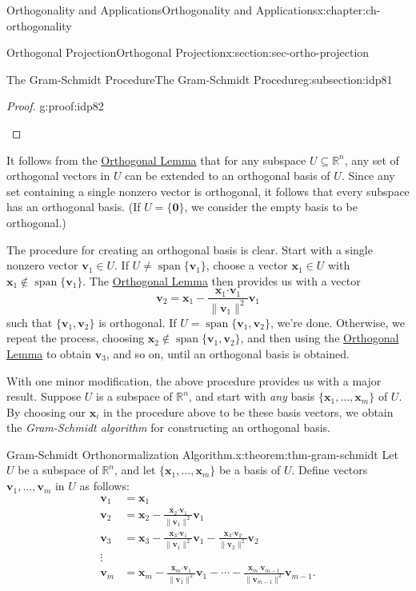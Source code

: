 \documentclass[oneside,10pt,]{book}
\numberwithin{equation}{section}
\newcommand{\spn}{\operatorname{span}}
\newcommand{\R}{\mathbb{R}}
\newcommand{\dotp}{\!\boldsymbol{\cdot}\!}
\newcommand{\len}[1]{\lVert #1\rVert}
\newcommand{\vv}{\mathbf{v}}
\newcommand{\xx}{\mathbf{x}}
\newcommand{\amp}{&}
\begin{document}
\begin{chapterptx}{Orthogonality and Applications}{}{Orthogonality and Applications}{}{}{x:chapter:ch-orthogonality}
\begin{sectionptx}{Orthogonal Projection}{}{Orthogonal Projection}{}{}{x:section:sec-ortho-projection}
\begin{subsectionptx}{The Gram-Schmidt Procedure}{}{The Gram-Schmidt Procedure}{}{}{g:subsection:idp81}
\begin{proof}{}{g:proof:idp82}
\begin{enumerate}
\end{enumerate}
%
\end{proof}
It follows from the \hyperref[x:theorem:thm-orthogonal-lemma]{Orthogonal Lemma} that for any subspace \(U\subseteq \R^n\), any set of orthogonal vectors in \(U\) can be extended to an orthogonal basis of \(U\). Since any set containing a single nonzero vector is orthogonal, it follows that every subspace has an orthogonal basis. (If \(U=\{\mathbf{0}\}\), we consider the empty basis to be orthogonal.)%
\par
The procedure for creating an orthogonal basis is clear. Start with a single nonzero vector \(\vv_1\in U\). If \(U\neq \spn\{\vv_1\}\), choose a vector \(\xx_1\in U\) with \(\xx_1\notin\spn\{\vv_1\}\). The \hyperref[x:theorem:thm-orthogonal-lemma]{Orthogonal Lemma} then provides us with a vector%
\begin{equation*}
\vv_2 = \xx_1-\frac{\xx_1\dotp\vv_1}{\len{\vv_1}^2}\vv_1
\end{equation*}
such that \(\{\vv_1,\vv_2\}\) is orthogonal. If \(U=\spn\{\vv_1,\vv_2\}\), we're done. Otherwise, we repeat the process, choosing \(\xx_2\notin\spn\{\vv_1,\vv_2\}\), and then using the \hyperref[x:theorem:thm-orthogonal-lemma]{Orthogonal Lemma} to obtain \(\vv_3\), and so on, until an orthogonal basis is obtained.%
\par
With one minor modification, the above procedure provides us with a major result. Suppose \(U\) is a subspace of \(\R^n\), and start with \emph{any} basis \(\{\xx_1,\ldots, \xx_m\}\) of \(U\). By choosing our \(\xx_i\) in the procedure above to be these basis vectors, we obtain the \emph{Gram-Schmidt algorithm} for constructing an orthogonal basis.%
\begin{theorem}{Gram-Schmidt Orthonormalization Algorithm.}{}{x:theorem:thm-gram-schmidt}%
Let \(U\) be a subspace of \(\R^n\), and let \(\{\xx_1,\ldots, \xx_m\}\) be a basis of \(U\). Define vectors \(\vv_1,\ldots, \vv_m\) in \(U\) as follows:%
\begin{align*}
\vv_1 \amp = \xx_1 \\
\vv_2 \amp = \xx_2 - \frac{\xx_2\dotp\vv_1}{\len{\vv_1}^2}\vv_1\\
\vv_3 \amp = \xx_3 - \frac{\xx_3\dotp\vv_1}{\len{\vv_1}^2}\vv_1-\frac{\xx_3\dotp\vv_2}{\len{\vv_2}^2}\vv_2\\
\vdots \amp \\
\vv_m \amp = \xx_m - \frac{\xx_m\dotp\vv_1}{\len{\vv_1}^2}\vv_1-\cdots - \frac{\xx_m\dotp\vv_{m-1}}{\len{\vv_{m-1}}^2}\vv_{m-1}\text{.}
\end{align*}

\end{theorem}
\end{subsectionptx}
\end{sectionptx}
\end{chapterptx}
\end{document}
